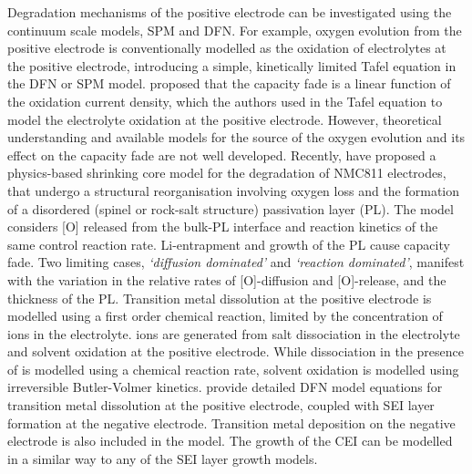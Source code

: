 \documentclass[journal=jacsat,manuscript=article]{achemso}
\begin{document}
Degradation mechanisms of the positive electrode can be investigated using the continuum scale models, SPM\cite{reniers2019review,jana2019physical} and DFN.\cite{lin2013comprehensive} 
For example, oxygen evolution from the positive electrode is conventionally modelled as the oxidation of electrolytes at the positive electrode, introducing a simple, kinetically limited Tafel equation\cite{lin2013comprehensive,reniers2019review} in the DFN or SPM model. 
\citeauthor{jana2019physical} proposed that the capacity fade is a linear function of the oxidation current density, which the authors used in the Tafel equation to model the electrolyte oxidation at the positive electrode.\cite{jana2019physical} 
However, theoretical understanding and available models for the source of the oxygen evolution and its effect on the capacity fade are not well developed. 
Recently, \citeauthor{ghosh2020shrinking} have proposed a physics-based shrinking core model for the degradation of NMC811 electrodes, that undergo a structural reorganisation involving oxygen loss and the formation of a disordered (spinel or rock-salt structure) passivation layer (PL). \cite{ghosh2020shrinking} 
The model considers [O] released from the bulk-PL interface and reaction kinetics of the same control reaction rate. 
Li-entrapment and growth of the PL cause capacity fade. 
Two limiting cases, \textit{`diffusion dominated'} and \textit{`reaction dominated'}, manifest with the variation in the relative rates of [O]-diffusion and [O]-release, and the thickness of the PL. 
Transition metal dissolution at the positive electrode is modelled using a first order chemical reaction, limited by the concentration of  ions in the electrolyte.\cite{dai2012capacity} 
 ions are generated from  salt dissociation in the electrolyte and solvent oxidation at the positive electrode. 
While  dissociation in the presence of  is modelled using a chemical reaction rate, solvent oxidation is modelled using irreversible Butler-Volmer kinetics.\cite{dai2012capacity} 
\citeauthor{lin2013comprehensive} provide detailed DFN model equations for transition metal dissolution at the positive electrode, coupled with SEI layer formation at the negative electrode.
Transition metal deposition on the negative electrode is also included in the model.\cite{lin2013comprehensive} 
The growth of the CEI can be modelled in a similar way to any of the SEI layer growth models.
\end{document}
